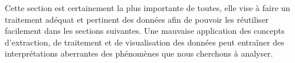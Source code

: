 Cette section est certainement la plus importante de toutes, elle vise à faire un traitement adéquat et pertinent des données afin de pouvoir les réutiliser facilement dans les sections suivantes. Une mauvaise application des concepts d’extraction, de traitement et de visualisation des données peut entraîner des interprétations aberrantes des phénomènes que nous cherchons à analyser.



